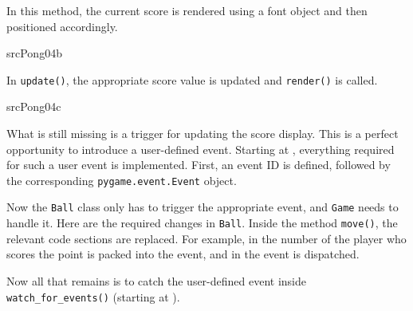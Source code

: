 In this method, the current score is rendered using a font object and then positioned accordingly.

{srcPong04b}

In \texttt{update()}, the appropriate score value is updated and \texttt{render()} is called.

{srcPong04c}

What is still missing is a trigger for updating the score display. This is a perfect opportunity to introduce a user-defined event. Starting at , everything required for such a user event is implemented. First, an event ID is defined, followed by the corresponding \texttt{pygame.e\-vent\-.E\-vent} object.


Now the \texttt{Ball} class only has to trigger the appropriate event, and \texttt{Game} needs to handle it. Here are the required changes in \texttt{Ball}. Inside the method \texttt{move()}, the relevant code sections are replaced. For example, in  the number of the player who scores the point is packed into the event, and in  the event is dispatched.

\newpage
{}

Now all that remains is to catch the user-defined event inside \texttt{watch\_for\_events()} (starting at ).



